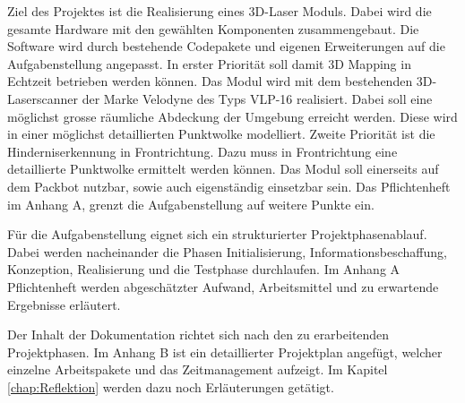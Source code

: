 Ziel des Projektes ist die Realisierung eines 3D-Laser Moduls. Dabei wird die gesamte Hardware mit den gewählten Komponenten zusammengebaut. Die Software wird durch bestehende Codepakete und eigenen Erweiterungen auf die Aufgabenstellung angepasst. In erster Priorität soll damit 3D Mapping in Echtzeit betrieben werden können. Das Modul wird mit dem bestehenden 3D-Laserscanner der Marke Velodyne des Typs VLP-16 realisiert. Dabei soll eine möglichst grosse räumliche Abdeckung der Umgebung erreicht werden. Diese wird in einer möglichst detaillierten Punktwolke modelliert. Zweite Priorität ist die Hinderniserkennung in Frontrichtung. Dazu muss in Frontrichtung eine detaillierte Punktwolke ermittelt werden können. Das Modul soll einerseits auf dem Packbot nutzbar, sowie auch eigenständig einsetzbar sein. Das Pflichtenheft im Anhang A, grenzt die Aufgabenstellung auf weitere Punkte ein.

Für die Aufgabenstellung eignet sich ein strukturierter Projektphasenablauf. Dabei werden nacheinander die Phasen Initialisierung, Informationsbeschaffung, Konzeption, Realisierung und die Testphase durchlaufen. Im Anhang A Pflichtenheft werden abgeschätzter Aufwand, Arbeitsmittel und zu erwartende Ergebnisse erläutert. 

Der Inhalt der Dokumentation richtet sich nach den zu erarbeitenden Projektphasen. Im Anhang B ist ein detaillierter Projektplan angefügt, welcher einzelne Arbeitspakete und das Zeitmanagement aufzeigt. Im Kapitel \ref{chap:Reflektion} werden dazu noch Erläuterungen getätigt.







